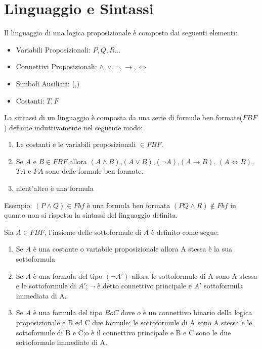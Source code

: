 \section{Linguaggio e Sintassi}
Il linguaggio di una logica proposizionale è composto dai seguenti elementi:

\begin{itemize}
  \item Variabili Proposizionali: $P,Q,R \dots$
  \item Connettivi Proposizionali: $\land, \lor, \neg, \rightarrow, \iff$
  \item Simboli Ausiliari: (,)
  \item Costanti: $T,F$
\end{itemize}

La sintassi di un linguaggio è composta da una serie di formule ben formate($FBF$) definite
induttivamente nel seguente modo:
\begin{enumerate}
  \item Le costanti e le variabili proposizionali $\in FBF$.
  \item Se $A$ e $B \in FBF$ allora $(A \land B)$,$(A \lor B)$,$(\neg A)$,$(A \rightarrow B)$,
        $(A \iff B)$,$TA$ e $FA$ sono delle formule ben formate.
  \item nient'altro è una formula
\end{enumerate}

Esempio:\newline
$(P \land Q) \in Fbf$  è una formula ben formata\newline
$(PQ \land R) \not \in Fbf$ in quanto non si rispetta la sintassi del linguaggio definita.\newline

Sia $A \in FBF$, l'insieme delle sottoformule di $A$ è definito come segue:
\begin{enumerate}
\item Se $A$ è una costante o variabile proposizionale allora A stessa è la sua sottoformula
\item Se $A$ è una formula del tipo $(\neg A')$ allora le sottoformule di A sono A stessa e le sottoformule di $A'$;
      $\neg$ è detto connettivo principale e $A'$ sottoformula immediata di A.
\item Se $A$ è una formula del tipo $B o C$ dove $o$ è un connettivo binario della logica proposizionale e B ed C due formule;
      le sottoformule di A sono A stessa e le sottoformule di B e C;o è il connettivo principale e B e C sono le due sottoformule immediate di A.
\end{enumerate}

